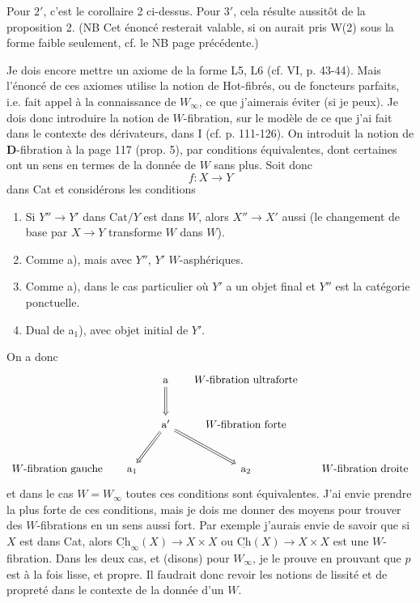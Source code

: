 \documentclass[11pt]{article}
\newcommand{\printedpage}[1]{\marginpar{\footnotesize p.~#1}}
\newcommand{\msp}[1]{\marginpar{\footnotesize [#1]}}
\newcommand{\Ch}{\underline{\mathrm{Ch}}}
\begin{document}
Pour $2'$, c'est le corollaire 2 ci-dessus. Pour $3'$, cela résulte aussitôt de la proposition 2. (NB Cet énoncé resterait valable, si on aurait pris W(2) sous la forme faible seulement, cf. le NB page précédente.)

Je dois encore mettre un axiome de la forme L5, L6 (cf. VI, p. 43-44). Mais l'énoncé de ces axiomes utilise la notion de Hot-fibrés, ou de foncteurs parfaits, i.e. fait appel à la connaissance de $W_\infty$, ce que j'aimerais éviter (si je peux). Je dois donc introduire la notion de $W$-fibration, sur le modèle de ce que j'ai fait dans le contexte des dérivateurs, dans I (cf. p. 111-126). On introduit la notion de \textbf{D}-fibration à la page 117 (prop. 5), par conditions équivalentes, dont certaines ont un sens en termes de la donnée de $W$ sans plus. Soit donc
\[ f : X \longrightarrow Y \]
dans Cat et considérons les conditions

\begin{enumerate}
\item[a)] Si $Y'' \longrightarrow Y'$ dans $\mathrm{Cat}/Y$ est dans $W$, alors $X'' \longrightarrow X'$ aussi (le changement de base par $X \longrightarrow Y$ transforme $W$ dans $W$).
\item[a$'$)] Comme a), mais avec $Y''$, $Y'$ $W$-asphériques.
\item[a$_1$)] Comme a), dans le cas particulier où $Y'$ a un objet final et $Y''$ est la catégorie ponctuelle.
\item[a$_2$)] Dual de a$_1$), avec objet initial de $Y'$.
\end{enumerate}

On a donc
\[
\begin{tikzcd}[row sep=large, column sep=1.4em]
 & & \mathrm{a} \arrow[d, Rightarrow] & \text{$W$-fibration ultraforte} & \\
 & & \mathrm{a}' \arrow[dl, Rightarrow] \arrow[dr, Rightarrow] & \text{$W$-fibration forte} & \\
\text{$W$-fibration gauche} & \mathrm{a}_1 & & \mathrm{a}_2 & \text{$W$-fibration droite}
\end{tikzcd}
\]
\printedpage{5}
et dans le cas $W = W_\infty$ toutes ces conditions sont équivalentes. J'ai envie prendre la plus forte de ces conditions, mais je dois me donner des moyens pour trouver des $W$-fibrations en un sens aussi fort. Par exemple j'aurais envie de savoir que si $X$
\msp{page 5}
est dans Cat, alors $\Ch_\infty(X) \longrightarrow X \times X$ ou $\Ch(X) \longrightarrow X \times X$ est une $W$-fibration. Dans les deux cas, et (disons) pour $W_\infty$, je le prouve en prouvant que $p$ est à la fois lisse, et propre. Il faudrait donc revoir les notions de lissité et de propreté dans le contexte de la donnée d'un $W$.
\end{document}
